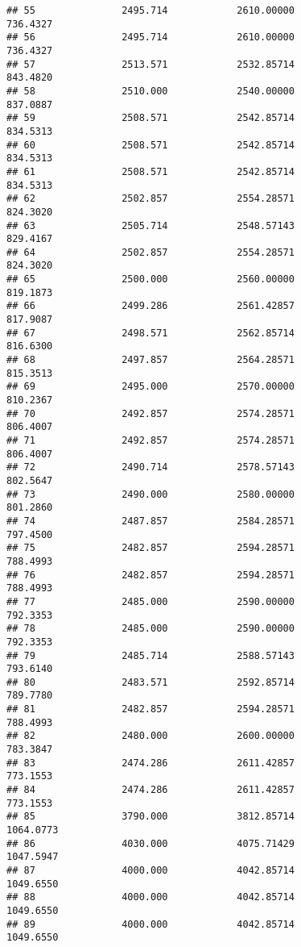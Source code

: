 \documentclass[]{article}
\begin{document}
\begin{verbatim}
## 55               2495.714            2610.00000                 736.4327
## 56               2495.714            2610.00000                 736.4327
## 57               2513.571            2532.85714                 843.4820
## 58               2510.000            2540.00000                 837.0887
## 59               2508.571            2542.85714                 834.5313
## 60               2508.571            2542.85714                 834.5313
## 61               2508.571            2542.85714                 834.5313
## 62               2502.857            2554.28571                 824.3020
## 63               2505.714            2548.57143                 829.4167
## 64               2502.857            2554.28571                 824.3020
## 65               2500.000            2560.00000                 819.1873
## 66               2499.286            2561.42857                 817.9087
## 67               2498.571            2562.85714                 816.6300
## 68               2497.857            2564.28571                 815.3513
## 69               2495.000            2570.00000                 810.2367
## 70               2492.857            2574.28571                 806.4007
## 71               2492.857            2574.28571                 806.4007
## 72               2490.714            2578.57143                 802.5647
## 73               2490.000            2580.00000                 801.2860
## 74               2487.857            2584.28571                 797.4500
## 75               2482.857            2594.28571                 788.4993
## 76               2482.857            2594.28571                 788.4993
## 77               2485.000            2590.00000                 792.3353
## 78               2485.000            2590.00000                 792.3353
## 79               2485.714            2588.57143                 793.6140
## 80               2483.571            2592.85714                 789.7780
## 81               2482.857            2594.28571                 788.4993
## 82               2480.000            2600.00000                 783.3847
## 83               2474.286            2611.42857                 773.1553
## 84               2474.286            2611.42857                 773.1553
## 85               3790.000            3812.85714                1064.0773
## 86               4030.000            4075.71429                1047.5947
## 87               4000.000            4042.85714                1049.6550
## 88               4000.000            4042.85714                1049.6550
## 89               4000.000            4042.85714                1049.6550

\end{verbatim}
\end{document}
